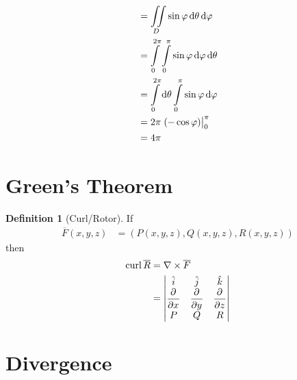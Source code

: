 \documentclass[fleqn, a4paper, 12pt, twoside]{article}
\theoremstyle{definition}
\newtheorem{definition}{Definition}
\theoremstyle{theorem}
\newcommand{\curl}{\mathrm{curl\,}}
\begin{document}
{\begin{solution}
\begin{align*}
                                                                   & = \iint\limits_{D} \sin \varphi \dif \theta \dif \varphi                                                                                               \\
                                                                   & = \int\limits_{0}^{2 \pi} \int\limits_{0}^{\pi} \sin \varphi \dif \varphi \dif \theta                                                                  \\
                                                                   & = \int\limits_{0}^{2 \pi} \dif \theta \int\limits_{0}^{\pi} \sin \varphi \dif \varphi                                                                  \\
                                                                   & = 2 \pi \left. \left( -\cos \varphi \right) \right|_{0}^{\pi}                                                                                          \\
                                                                   & = 4 \pi
	\end{align*}
\end{solution}

\section{Green's Theorem}

\begin{definition}[Curl/Rotor]
	If
	\begin{align*}
		\overline{F}(x,y,z) & = \left( P(x,y,z) , Q(x,y,z) , R(x,y,z) \right)
	\end{align*}
	then
	\begin{align*}
		\curl \overline{R} &= \nabla \times \overline{F}\\
		                &=
			\begin{vmatrix}
				\hat{i}   & \hat{j}   & \hat{k}   \\
				\dpd{}{x} & \dpd{}{y} & \dpd{}{z} \\
				P         & Q         & R
			\end{vmatrix}
	\end{align*}
\end{definition}

\section{Divergence}

}
\end{document}
